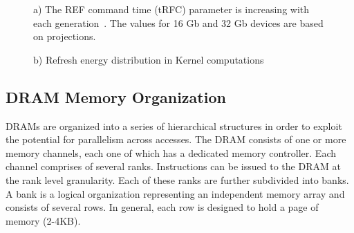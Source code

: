 \begin{figure}[ht!]
\begin{minipage}[b]{1\linewidth}
\centering
{}
\caption{\label{fig:refreshTrends}a) The REF command time (tRFC) parameter is increasing with each generation~\cite{jedec-sdram-standards}. The values for 16 Gb and 32 Gb devices are based on projections.}
\vspace{0.1in}
\end{minipage}
\addtocounter{figure}{-1}
\begin{minipage}[b]{1\linewidth}
\centering
{}
\caption{\label{fig:refreshTrends}b) Refresh energy distribution in Kernel computations}
\end{minipage}
\end{figure}

\subsection{DRAM Memory Organization}

DRAMs are organized into a series of hierarchical structures in order to exploit the potential for parallelism across accesses. The DRAM consists of one or more memory channels, each one of which has a dedicated memory controller. Each channel comprises of several ranks. Instructions can be issued to the DRAM at the rank level granularity. Each of these ranks are further subdivided into banks. A bank is a logical organization representing an independent memory array and consists of several rows. In general, each row is designed to hold a page of memory (2-4KB).

